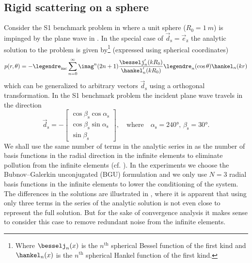 \subsection{Rigid scattering on a sphere}
Consider the S1 benchmark problem in \cite{Venas2019e3s} where a unit sphere ($R_0=\SI{1}{m}$) is impinged by the plane wave in . In the special case of $\vec{d}_{\mathrm{s}}=\vec{e}_{\mathrm{z}}$ the analytic solution to the problem is given by\footnote{Where $\besselj_n(x)$ is the $n^{\mathrm{th}}$ spherical Bessel function of the first kind and $\hankel_n(x)$ is the $n^{\mathrm{th}}$ spherical Hankel function of the first kind.} (expressed using spherical coordinates)
\begin{equation}\label{Eq5:analyticSolution}
	p(r,\theta) = -\legendre_{\mathrm{inc}}\sum_{n=0}^\infty \imag^n (2n+1) \frac{\besselj_n'(kR_0)}{\hankel_n'(kR_0)} \legendre_n(\cos\theta)\hankel_n(kr)
\end{equation}
which can be generalized to arbitrary vectors $\vec{d}_{\mathrm{s}}$ using a orthogonal transformation. In the S1 benchmark problem the incident plane wave travels in the direction
\begin{equation}
	\vec{d}_{\mathrm{s}} = -\begin{bmatrix}
		\cos\beta_{\mathrm{s}}\cos\alpha_{\mathrm{s}}\\
		\cos\beta_{\mathrm{s}}\sin\alpha_{\mathrm{s}}\\
		\sin\beta_{\mathrm{s}}
	\end{bmatrix}, \quad\text{where}\quad \alpha_{\mathrm{s}} = \ang{240},\,\beta_{\mathrm{s}} = \ang{30}.
\end{equation}
We shall use the same number of terms in the analytic series in  as the number of basis functions in the radial direction in the infinite elements to eliminate pollution from the infinite elements (cf. \cite{Gerdes1999otp}). In the experiments we choose the Bubnov--Galerkin unconjugated (BGU) formulation and we only use $N=3$ radial basis functions in the infinite elements to lower the conditioning of the system. The differences in the solutions are illustrated in , where it is apparent that using only three terms in the series of the analytic solution is not even close to represent the full solution. But for the sake of convergence analysis it makes sense to consider this case to remove redundant noise from the infinite elements.
